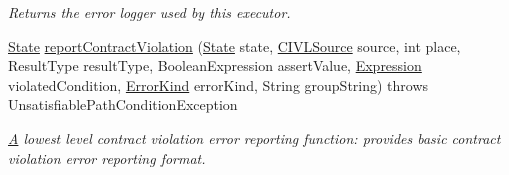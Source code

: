 \begin{DoxyCompactItemize}
\begin{DoxyCompactList}\small\item\em Returns the error logger used by this executor. \end{DoxyCompactList}\item 
\hyperlink{interfaceedu_1_1udel_1_1cis_1_1vsl_1_1civl_1_1state_1_1IF_1_1State}{State} \hyperlink{classedu_1_1udel_1_1cis_1_1vsl_1_1civl_1_1semantics_1_1common_1_1CommonExecutor_a0b2523d597d3638be5fdb3681eab54d5}{report\+Contract\+Violation} (\hyperlink{interfaceedu_1_1udel_1_1cis_1_1vsl_1_1civl_1_1state_1_1IF_1_1State}{State} state, \hyperlink{interfaceedu_1_1udel_1_1cis_1_1vsl_1_1civl_1_1model_1_1IF_1_1CIVLSource}{C\+I\+V\+L\+Source} source, int place, Result\+Type result\+Type, Boolean\+Expression assert\+Value, \hyperlink{interfaceedu_1_1udel_1_1cis_1_1vsl_1_1civl_1_1model_1_1IF_1_1expression_1_1Expression}{Expression} violated\+Condition, \hyperlink{enumedu_1_1udel_1_1cis_1_1vsl_1_1civl_1_1model_1_1IF_1_1CIVLException_1_1ErrorKind}{Error\+Kind} error\+Kind, String group\+String)  throws Unsatisfiable\+Path\+Condition\+Exception 
\begin{DoxyCompactList}\small\item\em \hyperlink{structA}{A} lowest level contract violation error reporting function\+: provides basic contract violation error reporting format. \end{DoxyCompactList}\end{DoxyCompactItemize}
